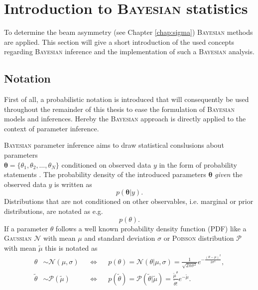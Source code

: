 \section{Introduction to \textsc{Bayesian} statistics}
\label{sec:bayes}
To determine the beam asymmetry (see Chapter \ref{chap:sigma}) \textsc{Bayesian} methods are applied. This section will give a short introduction of the used concepts regarding \textsc{Bayesian} inference and the implementation of such a \textsc{Bayesian} analysis.
\subsection{Notation}
 First of all, a probabilistic notation is introduced that will consequently be used throughout the remainder of this thesis to ease the formulation of \textsc{Bayesian} models and inferences. Hereby the \textsc{Bayesian} approach is directly applied to the context of parameter inference. 
 
 \noindent\textsc{Bayesian} parameter inference aims to draw statistical conslusions about parameters\\ $\boldsymbol{\theta}=\{\theta_1,\theta_2,\dots,\theta_N\}$ conditioned on observed data $y$ in the form of probability statements \cite{bayes}. The probability density of the introduced parameters $\boldsymbol{\theta}$ \emph{given} the observed data $y$ is written as 
 \begin{equation}
 	 p(\boldsymbol{\theta}|y).
 \end{equation}
Distributions that are not conditioned on other observables, i.e. marginal or prior distributions, are notated as e.g.
\begin{equation}
	p({\theta}).
\end{equation}
If a parameter $\theta$ follows a well known probability density function (PDF) like a \textsc{Gaussian} $\mathcal{N}$ with mean $\mu$ and standard deviation $\sigma$ or \textsc{Poisson} distribution $\mathcal{P}$ with mean $\tilde{\mu}$ this is notated as
\begin{align}
	\theta&\sim\mathcal{N}(\mu,\sigma)&&\Leftrightarrow&& p(\theta)=\mathcal{N}(\theta|\mu,\sigma)=\frac{1}{\sqrt{2\pi\sigma^2}}e^{-\frac{(\theta-\mu)^2}{2\sigma^2}},\\
	\tilde{\theta}&\sim\mathcal{P}(\tilde{\mu})&&\Leftrightarrow&&p(\tilde{\theta})=\mathcal{P}(\tilde{\theta}|\tilde{\mu})=\frac{\tilde{\mu}^\theta}{\tilde{\theta}!}e^{-\tilde{\mu}}.
\end{align}
